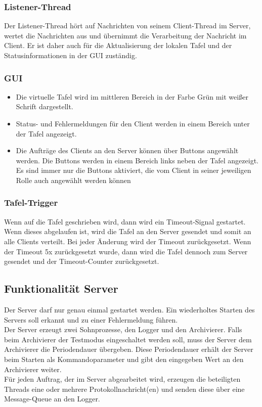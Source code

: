 \subsubsection{Listener-Thread}
Der Listener-Thread hört auf Nachrichten von seinem Client-Thread im Server, wertet die Nachrichten aus 
und übernimmt die Verarbeitung der Nachricht im Client. Er ist daher auch für die Aktualisierung der lokalen 
Tafel und der Statusinformationen in der GUI zuständig.

\subsubsection{GUI}
\begin{itemize}
	\item Die virtuelle Tafel wird im mittleren Bereich in der Farbe Grün mit weißer Schrift dargestellt.
	\item Status- und Fehlermeldungen für den Client werden in einem Bereich unter der Tafel angezeigt.
	\item Die Aufträge des Clients an den Server können über Buttons angewählt werden. Die Buttons werden 
in einem Bereich links neben der Tafel angezeigt. Es sind immer nur die Buttons aktiviert, die vom 
Client in seiner jeweiligen Rolle auch angewählt werden können
\end{itemize}

\subsubsection{Tafel-Trigger}
Wenn auf die Tafel geschrieben wird, dann wird ein Timeout-Signal gestartet. Wenn dieses abgelaufen ist, 
wird die Tafel an den Server gesendet und somit an alle Clients verteilt. Bei jeder Änderung wird der 
Timeout zurückgesetzt. Wenn der Timeout 5x zurückgesetzt wurde, dann wird die Tafel dennoch zum Server 
gesendet und der Timeout-Counter zurückgesetzt.

\subsection{Funktionalität Server}
Der Server darf nur genau einmal gestartet werden. Ein wiederholtes Starten des Servers soll erkannt und 
zu einer Fehlermeldung führen. \\
Der Server erzeugt zwei Sohnprozesse, den Logger und den Archivierer. Falls beim Archivierer der Testmodus 
eingeschaltet werden soll, muss der Server dem Archivierer die Periodendauer übergeben. Diese Periodendauer 
erhält der Server beim Starten als Kommandoparameter und gibt den eingegeben Wert an den Archivierer weiter. \\
Für jeden Auftrag, der im Server abgearbeitet wird, erzeugen die beteiligten Threads eine oder mehrere 
Protokollnachricht(en) und senden diese über eine Message-Queue an den Logger. \\

